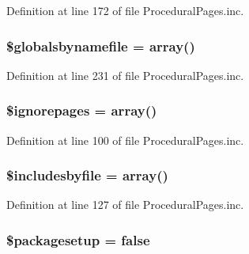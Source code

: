 \-Definition at line 172 of file \-Procedural\-Pages.\-inc.

\hypertarget{class_procedural_pages_af52501416e46795705bcefc529cbfb59}{
\subsubsection[{\$globalsbynamefile}]{\setlength{\rightskip}{0pt plus 5cm}\$globalsbynamefile = array()}}\label{class_procedural_pages_af52501416e46795705bcefc529cbfb59}


\-Definition at line 231 of file \-Procedural\-Pages.\-inc.

\hypertarget{class_procedural_pages_a3ee70761f9201a9b717b969526f4cf91}{
\subsubsection[{\$ignorepages}]{\setlength{\rightskip}{0pt plus 5cm}\$ignorepages = array()}}\label{class_procedural_pages_a3ee70761f9201a9b717b969526f4cf91}


\-Definition at line 100 of file \-Procedural\-Pages.\-inc.

\hypertarget{class_procedural_pages_aa3a68ad0927d9cfb1e8c87048375322a}{
\subsubsection[{\$includesbyfile}]{\setlength{\rightskip}{0pt plus 5cm}\$includesbyfile = array()}}\label{class_procedural_pages_aa3a68ad0927d9cfb1e8c87048375322a}


\-Definition at line 127 of file \-Procedural\-Pages.\-inc.

\hypertarget{class_procedural_pages_a8b081238ba656c404291aca4cd30ab17}{
\subsubsection[{\$packagesetup}]{\setlength{\rightskip}{0pt plus 5cm}\$packagesetup = false}}\label{class_procedural_pages_a8b081238ba656c404291aca4cd30ab17}



